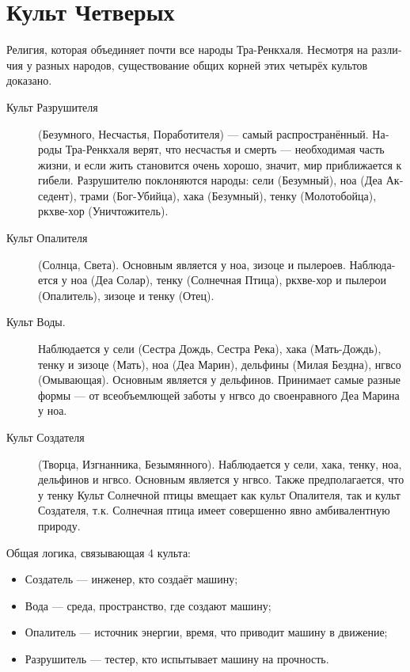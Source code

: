 \documentclass[a4paper,12pt,fleqn]{book}\usepackage{polyglossia}\setdefaultlanguage[babelshorthands=true]{russian}\setotherlanguage{english}\defaultfontfeatures{Ligatures=TeX,Mapping=tex-text}\usepackage{xcolor}\newcommand{\ml}[3]{#2}
\begin{document}
{\section{Культ Четверых}

Религия, которая объединяет почти все народы Тра-Ренкхаля.
Несмотря на различия у разных народов, существование общих корней этих четырёх культов доказано.

\begin{description}
\item[Культ Разрушителя] (Безумного, Несчастья, Поработителя) --- самый распространённый.
Народы Тра-Ренкхаля верят, что несчастья и смерть --- необходимая часть жизни, и если жить становится очень хорошо, значит, мир приближается к гибели.
Разрушителю поклоняются народы: сели (Безумный), ноа (Деа Акседент), трами (Бог-Убийца), хака (Безумный), тенку (Молотобойца), ркхве-хор (Уничтожитель).

\item[Культ Опалителя] (Солнца, Света).
Основным является у ноа, зизоце и пылероев.
Наблюдается у ноа (Деа Солар), тенку (Солнечная Птица), ркхве-хор и пылерои (Опалитель), зизоце и тенку (Отец).

\item[Культ Воды.] Наблюдается у сели (Сестра Дождь, Сестра Река), хака (Мать-Дождь), тенку и зизоце (Мать), ноа (Деа Марин), дельфины (Милая Бездна), нгвсо (Омывающая).
Основным является у дельфинов. Принимает самые разные формы --- от всеобъемлющей заботы у нгвсо до своенравного Деа Марина у ноа.

\item[Культ Создателя] (Творца, Изгнанника, Безымянного).
Наблюдается у сели, хака, тенку, ноа, дельфинов и нгвсо.
Основным является у нгвсо.
Также предполагается, что у тенку Культ Солнечной птицы вмещает как культ Опалителя, так и культ Создателя, т.к. Солнечная птица имеет совершенно явно амбивалентную природу.
\end{description}

Общая логика, связывающая 4 культа:

\begin{itemize}
\item Создатель --- инженер, кто создаёт машину;
\item Вода --- среда, пространство, где создают машину;
\item Опалитель --- источник энергии, время, что приводит машину в движение;
\item Разрушитель --- тестер, кто испытывает машину на прочность.
\end{itemize}

}
\end{document}
